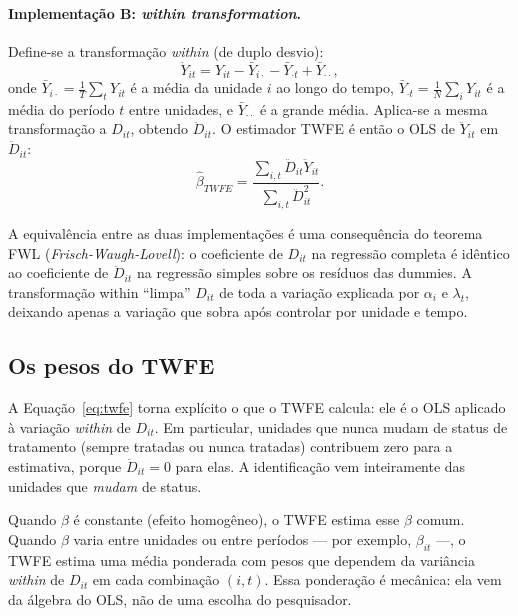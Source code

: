 \paragraph{Implementação B: \textit{within transformation}.} Define-se a transformação \textit{within} (de duplo desvio):
\begin{equation}
\ddot{Y}_{it} = Y_{it} - \bar{Y}_{i\cdot} - \bar{Y}_{\cdot t} + \bar{Y}_{\cdot\cdot},
\label{eq:within}
\end{equation}
onde $\bar{Y}_{i\cdot} = \frac{1}{T} \sum_t Y_{it}$ é a média da unidade $i$ ao longo do tempo, $\bar{Y}_{\cdot t} = \frac{1}{N} \sum_i Y_{it}$ é a média do período $t$ entre unidades, e $\bar{Y}_{\cdot\cdot}$ é a grande média. Aplica-se a mesma transformação a $D_{it}$, obtendo $\ddot{D}_{it}$. O estimador TWFE é então o OLS de $\ddot{Y}_{it}$ em $\ddot{D}_{it}$:
\begin{equation}
\hat{\beta}_{TWFE} = \frac{\sum_{i,t} \ddot{D}_{it} \ddot{Y}_{it}}{\sum_{i,t} \ddot{D}_{it}^2}.
\label{eq:twfe}
\end{equation}

A equivalência entre as duas implementações é uma consequência do teorema FWL (\textit{Frisch-Waugh-Lovell}): o coeficiente de $D_{it}$ na regressão completa é idêntico ao coeficiente de $\ddot{D}_{it}$ na regressão simples sobre os resíduos das dummies. A transformação within ``limpa'' $D_{it}$ de toda a variação explicada por $\alpha_i$ e $\lambda_t$, deixando apenas a variação que sobra após controlar por unidade e tempo.

\subsection*{Os pesos do TWFE}

A Equação~\eqref{eq:twfe} torna explícito o que o TWFE calcula: ele é o OLS aplicado à variação \textit{within} de $D_{it}$. Em particular, unidades que nunca mudam de status de tratamento (sempre tratadas ou nunca tratadas) contribuem zero para a estimativa, porque $\ddot{D}_{it} = 0$ para elas. A identificação vem inteiramente das unidades que \textit{mudam} de status.

Quando $\beta$ é constante (efeito homogêneo), o TWFE estima esse $\beta$ comum. Quando $\beta$ varia entre unidades ou entre períodos --- por exemplo, $\beta_{it}$ ---, o TWFE estima uma média ponderada com pesos que dependem da variância \textit{within} de $D_{it}$ em cada combinação $(i, t)$. Essa ponderação é mecânica: ela vem da álgebra do OLS, não de uma escolha do pesquisador.

